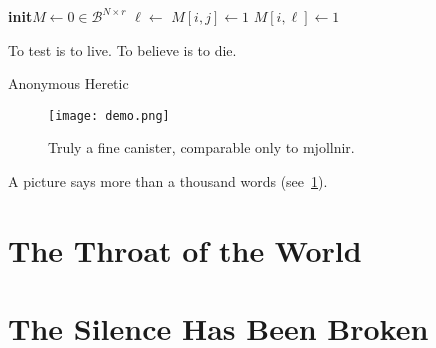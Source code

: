 \documentclass[a4paper, 11pt]{memoir}
\begin{document}
\begin{algorithm}
	\small
	\begin{shaded}
		\begin{algorithmic}[1]
			\newcommand*{\To}{\textbf{to}\xspace}
			\newcommand*{\Init}{\State\textbf{init}\xspace}
			\newcommand*{\B}{\mathcal{B}}
			\Init \(M \gets 0 \in \B^{N \times r}\) 
			\For{ \(i \gets 1\) \To N}
			\For{ \(j \gets r - r_1 + 1\) \To \(r\)}
			\State \(\ell \gets \)  
			\State \({M}[i, j] \gets 1\)
			\Else
			\State \({M}[i, \ell] \gets 1\)
			\EndIf
			\EndFor
			\EndFor
		\end{algorithmic}
	\end{shaded}
	\caption[Uncorrelated random data generation]{%
		Algorithm for the generation of a block $M$ of $N$ uncorrelated random
		vectors of length $r$, containing exactly $r_1$ ones.}%
	\label{alg:binam_random_data}
\end{algorithm}

\epigraph{To test is to live. To believe is to die.}{Anonymous Heretic}
\blindtext

\begin{figure}
	\centering
	\texttt{[image: demo.png]}
	\caption{Truly a fine canister, comparable only to \gls{mjollnir}.}%
	\label{fig:canister}
\end{figure}

\Blindtext\Blindtext

A picture says more than a thousand words (see~\ref{fig:canister}).

\section{The Throat of the World}

\blindtext


\section{The Silence Has Been Broken}

\blindtext

\end{document}
